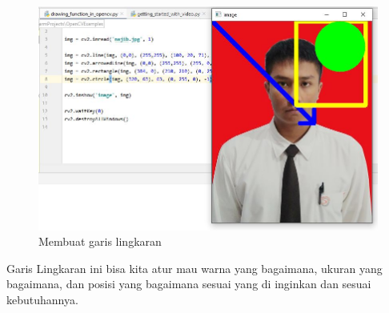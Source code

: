 \begin{figure}[ht]
\centering
\includegraphics[scale=0.5]{figures/2,13.jpg}
\caption{Membuat garis lingkaran}
\label{contoh}
\end{figure}

Garis Lingkaran ini bisa kita atur mau warna yang bagaimana, ukuran yang bagaimana, dan posisi yang bagaimana sesuai yang di inginkan dan sesuai kebutuhannya.

\newpage
